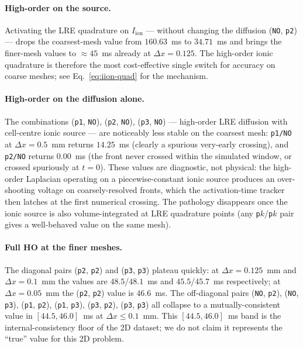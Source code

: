 \documentclass[11pt,a4paper]{article}
\newcommand{\Iion}{I_{\text{ion}}}
\newcommand{\code}[1]{\texttt{\small #1}}
\begin{document}
\paragraph{High-order on the source.}
Activating the LRE quadrature on $\Iion$ — without changing the
diffusion (\code{NO}, \code{p2}) — drops the coarsest-mesh value
from $160.63$~ms to $34.71$~ms and brings the finer-mesh values to
$\approx 45$~ms already at $\Delta x = 0.125$. The high-order ionic
quadrature is therefore the most cost-effective single switch for
accuracy on coarse meshes; see Eq.~\eqref{eq:iion-quad} for the
mechanism.

\paragraph{High-order on the diffusion alone.}
The combinations (\code{p1}, \code{NO}), (\code{p2}, \code{NO}),
(\code{p3}, \code{NO}) — high-order LRE diffusion with cell-centre
ionic source — are noticeably less stable on the coarsest mesh:
\code{p1/NO} at $\Delta x=0.5$~mm returns $14.25$~ms (clearly a
spurious very-early crossing), and \code{p2/NO} returns $0.00$~ms
(the front never crossed within the simulated window, or crossed
spuriously at $t=0$). These values are diagnostic, not physical:
the high-order Laplacian operating on a piecewise-constant ionic
source produces an over-shooting voltage on coarsely-resolved fronts,
which the activation-time tracker then latches at the first numerical
crossing. The pathology disappears once the ionic source is also
volume-integrated at LRE quadrature points (any \code{p$k$}/\code{p$k$}
pair gives a well-behaved value on the same mesh).

\paragraph{Full HO at the finer meshes.}
The diagonal pairs (\code{p2}, \code{p2}) and (\code{p3}, \code{p3})
plateau quickly: at $\Delta x = 0.125$~mm and $\Delta x = 0.1$~mm
the values are $48.5$/$48.1$~ms and $45.5$/$45.7$~ms respectively;
at $\Delta x = 0.05$~mm the (\code{p2}, \code{p2}) value is
$46.6$~ms. The off-diagonal pairs
(\code{NO}, \code{p2}), (\code{NO}, \code{p3}),
(\code{p1}, \code{p2}), (\code{p1}, \code{p3}),
(\code{p3}, \code{p2}), (\code{p3}, \code{p3}) all collapse to a
mutually-consistent value in $[44.5, 46.0]$~ms at $\Delta x \le 0.1$~mm.
This $[44.5, 46.0]$~ms band is the internal-consistency floor of
the 2D dataset; we do not claim it represents the ``true'' value
for this 2D problem.
\end{document}

